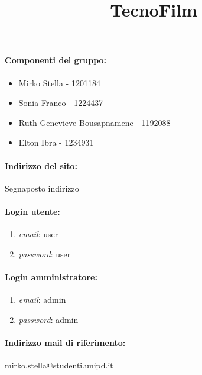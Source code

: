 \documentclass[a4paper]{article}
\title{\Huge \textbf {TecnoFilm}}
\date{}
\begin{document}
\maketitle

\vfill
\paragraph*{Componenti del gruppo:}
\begin{itemize}
    \item Mirko Stella - 1201184 
    \item Sonia Franco - 1224437
    \item Ruth Genevieve Bousapnamene - 1192088  
    \item Elton Ibra - 1234931
\end{itemize}

\paragraph*{Indirizzo del sito:}
Segnaposto indirizzo

\paragraph*{Login utente:}
\begin{enumerate}
    \item [] \textit{email}: user 
    \item [] \textit{password}: user
\end{enumerate}
 
\paragraph*{Login amministratore:}
\begin{enumerate}
    \item [] \textit{email}: admin 
    \item [] \textit{password}: admin
\end{enumerate}

\paragraph*{Indirizzo mail di riferimento:}

mirko.stella@studenti.unipd.it

\vfill

\newpage

\tableofcontents
\end{document}
